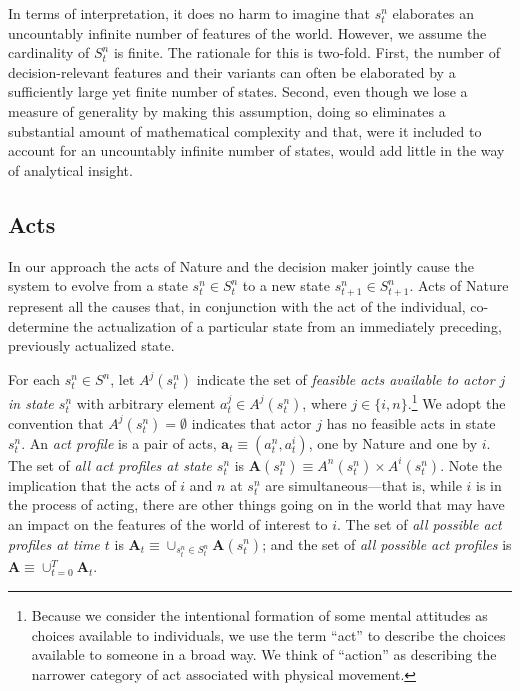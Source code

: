 \documentclass[
11pt,
titlepage,
reqno,
]{article}%
\theoremstyle{definition}
\begin{document}
In terms of interpretation, it does no harm to imagine that $s^n_t$ elaborates an uncountably infinite number of features of the world.
However,  we assume the cardinality of $S^n_t$ is finite.
The rationale for this is two-fold.
First, the number of decision-relevant features and their variants can often be elaborated by a sufficiently large yet finite number of states.
Second, even  though we lose a measure of generality by making this assumption, doing so eliminates a substantial amount of mathematical complexity and that, were it included to account for an uncountably infinite number of states, would add little in the way of analytical insight.

\subsection{Acts}\label{sec:acts}

In our approach the acts of Nature and the decision maker jointly cause the system to evolve from a state $s^n_t\in S^n_t$ to a new state $s^n_{t+1}\in S^n_{t+1}$.
Acts of Nature represent all the causes that, in conjunction with the act of the individual, co-determine the actualization of a particular state from an immediately preceding, previously actualized state.

For each  $s^n_t\in S^n$, let $A^j(s^n_t)$ indicate the set of \textit{feasible acts available to actor $j$ in state $s^n_t$} with arbitrary element $a^j_t\in A^j(s^n_t)$, where $j\in\{i,n\}$.\footnote
{
	Because we consider the intentional formation of some mental attitudes as choices available to individuals, we use the term ``act'' to describe the choices available to someone in a broad way.
	We think of ``action'' as describing the narrower category of act associated with physical movement.
} 
We adopt the convention that $A^j(s^n_t)=\emptyset$ indicates that actor $j$ has no feasible acts in state $s^n_t$.
An \textit{act profile} is a pair of acts, $\mathbf{a}_t\equiv(a^n_t,a^i_t)$, one by Nature and one by $i$. 
The set of \textit{all act profiles at state $s^n_t$} is $\mathbf{A}(s^n_t)\equiv A^n(s^n_t)\times A^i(s^n_t)$.
Note the implication that the acts of $i$ and $n$ at $s^n_t$ are simultaneous---that is, while $i$ is in the process of acting, there are other things going on in the world that may have an impact on the features of the world of interest to $i$.
The set of \textit{all possible act profiles at time $t$} is  $\mathbf{A}_t\equiv \cup_{s^n_t\in S^n_t} \mathbf{A}(s^n_t)$; and the set of \textit{all possible act profiles} is $\mathbf{A}\equiv \cup_{t=0}^{T} \mathbf{A}_t$. 
\end{document}
